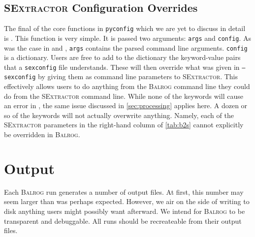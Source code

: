 \documentclass[11pt]{book}
\newcommand{\codett}[1]{\texttt{#1}}
\newcommand{\pyconfig}{\codett{pyconfig}}
\newcommand{\balrog}{\textsc{Balrog}}
\newcommand{\sex}{\textsc{SExtractor}}
\newcommand{\opt}[1]{\codett{--#1}}
\begin{document}
\section{\sex{} Configuration Overrides}
\label{sec:sexoverride}

The final of the core functions in \pyconfig{} which we are yet to discuss in detail is \sexfunc{}.
This function is very simple. It is passed two arguments: \codett{args} and \codett{config}.
As was the case in \simfunc{} and \gspfunc{}, \codett{args} contains the parsed command line arguments.
\codett{config} is a dictionary. Users are free to add to the dictionary the keyword-value pairs
that a \codett{sexconfig} file understands. These will then override what was given in \opt{sexconfig}
by giving them as command line parameters to \sex{}.
This effectively allows users to do anything from the \balrog{} command line they could do from the \sex{} command line.
While none of the keywords will cause an error in \sexfunc{}, 
the same issue discussed in \autoref{sec:processing} applies here.
A dozen or so of the keywords will not actually overwrite anything.
Namely, each of the \sex{} parameters in the right-hand column of \autoref{tab:b2s} cannot explicitly be overridden in \balrog{}.



\chapter{Output}
\label{sec:out}
Each \balrog{} run generates a number of output files. 
At first, this number may seem larger than was perhaps expected.
However, we air on the side of writing to disk anything users might possibly want afterward.
We intend for \balrog{} to be transparent and debuggable.
All runs should be recreateable from their output files.
\end{document}
